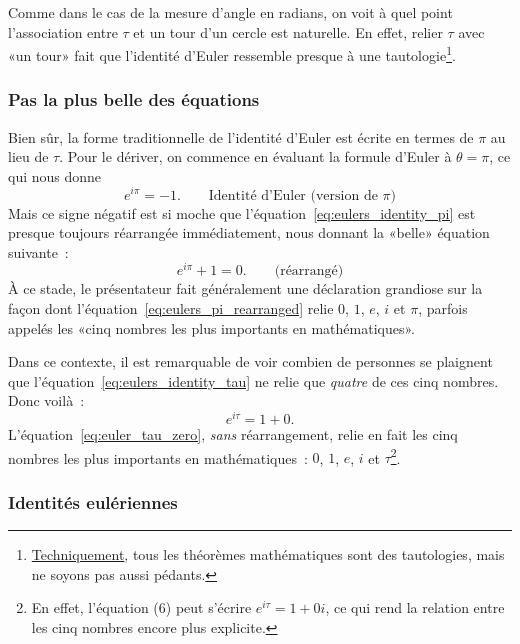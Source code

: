 Comme dans le cas de la mesure d'angle en radians, on voit à quel point
l'association entre $\tau$ et un tour d'un cercle est naturelle. En effet,
relier $\tau$ avec «\ns un tour\ns » fait que l'identité d'Euler
ressemble presque à une
tautologie\ns\footnote{\href{https://bit.ly/32mB2CF}{Techniquement}, tous les
théorèmes mathématiques sont des tautologies, mais ne soyons pas aussi
pédants.}.

    \subsubsection{Pas la plus belle des équations} %
    \label{sec:not_the_most_beautiful_equation}

Bien sûr, la forme traditionnelle de l'identité d'Euler est écrite en termes de
$\pi$ au lieu de $\tau$. Pour le dériver, on commence en évaluant la formule
d'Euler à $\theta = \pi$, ce qui nous donne
\begin{equation}
\label{eq:eulers_identity_pi}
e^{i\pi} = -1. \qquad\mbox{Identité d'Euler (version de $\pi$)}
\end{equation}
\noindent Mais ce signe négatif est si moche que
l'équation~\eqref{eq:eulers_identity_pi} est presque toujours réarrangée
immédiatement, nous donnant la «\ns belle\ns » équation suivante~:
\begin{equation}
\label{eq:eulers_pi_rearranged}
e^{i\pi} + 1 = 0. \qquad\mbox{(réarrangé)}
\end{equation}
À ce stade, le présentateur fait généralement une déclaration grandiose sur la façon
dont l'équation~\eqref{eq:eulers_pi_rearranged} relie $0$, $1$, $e$, $i$ et
$\pi$, parfois appelés les «\ns cinq nombres les plus importants en
mathématiques\ns ».

Dans ce contexte, il est remarquable de voir combien de personnes se plaignent
que l'équation~\eqref{eq:eulers_identity_tau} ne relie que \emph{quatre} de ces
cinq nombres. Donc voilà~:
\begin{equation}
\label{eq:euler_tau_zero}
e^{i\tau} = 1 + 0.
\end{equation}
L'équation~\eqref{eq:euler_tau_zero}, \emph{sans} réarrangement, relie en fait
les cinq nombres les plus importants en mathématiques~: $0$, $1$, $e$, $i$ et
$\tau$\ns\footnote{En effet, l'équation (6) peut s'écrire $e^{i\tau} = 1 + 0i$,
ce qui rend la relation entre les cinq nombres encore plus explicite.}.

      \subsubsection{Identités eulériennes} %
      \label{sec:eulerian_identities}

